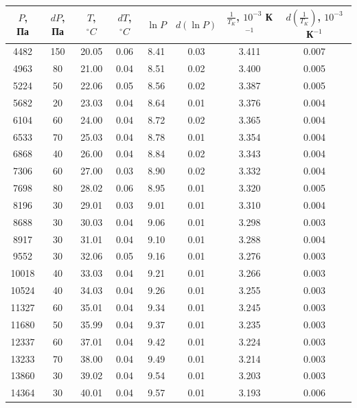 \documentclass[a4paper,12pt]{article} %
\begin{document}
\begin{enumerate}
  \begin{table}[h]
    \centering
    \begin{tabular}{|c|c|c|c||c|c|c|c|}
      \hline
      $P$, Па & $dP$, Па & $T$, $^\circ C$ & $dT$, $^\circ C$ & $\ln P$ & $d(\ln P)$ & $\frac{1}{T_K}$, $10^{-3}$ К$^{-1}$ & $d\left(\frac{1}{T_K}\right)$, $10^{-3}$ К$^{-1}$ \\
      \hline
      4482  & 150 & 20.05 & 0.06 & 8.41 & 0.03 & 3.411 & 0.007 \\
      4963  & 80  & 21.00 & 0.04 & 8.51 & 0.02 & 3.400 & 0.005 \\
      5224  & 50  & 22.06 & 0.05 & 8.56 & 0.02 & 3.387 & 0.005 \\
      5682  & 20  & 23.03 & 0.04 & 8.64 & 0.01 & 3.376 & 0.004 \\
      6104  & 60  & 24.00 & 0.04 & 8.72 & 0.02 & 3.365 & 0.004 \\
      6533  & 70  & 25.03 & 0.04 & 8.78 & 0.01 & 3.354 & 0.004 \\
      6868  & 40  & 26.00 & 0.04 & 8.84 & 0.02 & 3.343 & 0.004 \\
      7306  & 60  & 27.00 & 0.03 & 8.90 & 0.02 & 3.332 & 0.004 \\
      7698  & 80  & 28.02 & 0.06 & 8.95 & 0.01 & 3.320 & 0.005 \\
      8196  & 30  & 29.01 & 0.03 & 9.01 & 0.01 & 3.310 & 0.004 \\
      8688  & 30  & 30.03 & 0.04 & 9.06 & 0.01 & 3.298 & 0.003 \\
      8917  & 30  & 31.01 & 0.04 & 9.10 & 0.01 & 3.288 & 0.004 \\
      9552  & 30  & 32.06 & 0.05 & 9.16 & 0.01 & 3.276 & 0.003 \\
      10018 & 40  & 33.03 & 0.04 & 9.21 & 0.01 & 3.266 & 0.003 \\
      10524 & 40  & 34.03 & 0.04 & 9.26 & 0.01 & 3.255 & 0.003 \\
      11327 & 60  & 35.01 & 0.04 & 9.34 & 0.01 & 3.245 & 0.003 \\
      11680 & 50  & 35.99 & 0.04 & 9.37 & 0.01 & 3.235 & 0.003 \\
      12337 & 60  & 37.01 & 0.04 & 9.42 & 0.01 & 3.224 & 0.003 \\
      13233 & 70  & 38.00 & 0.04 & 9.49 & 0.01 & 3.214 & 0.003 \\
      13860 & 30  & 39.02 & 0.04 & 9.54 & 0.01 & 3.203 & 0.003 \\
      14364 & 30  & 40.01 & 0.04 & 9.57 & 0.01 & 3.193 & 0.006 \\
      \hline
      \end{tabular}
      

\end{table}
\end{enumerate}
\end{document}
